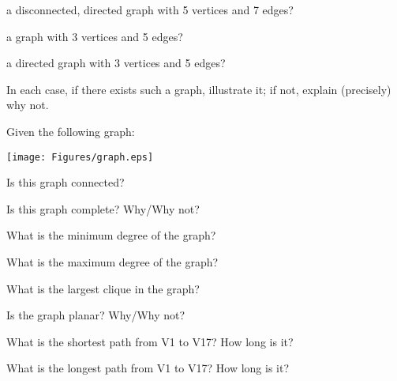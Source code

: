 \sq a disconnected, directed graph with 5 vertices and 7 edges?

\sq a graph with 3 vertices and 5 edges?

\sq a directed graph with 3 vertices and 5 edges?

In each case, if there exists such a graph, illustrate it; if not,
explain (precisely) why not.

\newpage

 Given the following graph:

\begin{center}
\texttt{[image: Figures/graph.eps]}
\end{center}

\sq Is this graph connected?

\sq Is this graph complete?  Why/Why not?

\sq What is the minimum degree of the graph?

\sq What is the maximum degree of the graph?

\sq What is the largest clique in the graph?

\sq Is the graph planar? Why/Why not?

\sq What is the shortest path from V1 to V17? How long is it?

\sq What is the longest path from V1 to V17?  How long is it?


